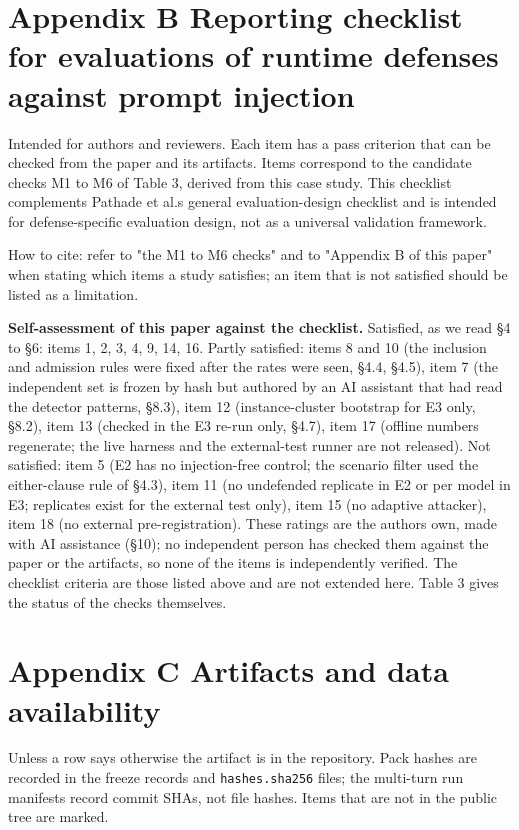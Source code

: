 \documentclass[10pt]{article}
\begin{document}
\section{Appendix B Reporting checklist for evaluations of runtime defenses against prompt injection}

Intended for authors and reviewers. Each item has a pass criterion that can be checked from the paper and its artifacts. Items correspond to the candidate checks M1 to M6 of Table 3, derived from this case study. This checklist complements Pathade et al.\textquotesingle s general evaluation-design checklist and is intended for defense-specific evaluation design, not as a universal validation framework.



How to cite: refer to "the M1 to M6 checks" and to "Appendix B of this paper" when stating which items a study satisfies; an item that is not satisfied should be listed as a limitation.

\textbf{Self-assessment of this paper against the checklist.} Satisfied, as we read §4 to §6: items 1, 2, 3, 4, 9, 14, 16. Partly satisfied: items 8 and 10 (the inclusion and admission rules were fixed after the rates were seen, §4.4, §4.5), item 7 (the independent set is frozen by hash but authored by an AI assistant that had read the detector patterns, §8.3), item 12 (instance-cluster bootstrap for E3 only, §8.2), item 13 (checked in the E3 re-run only, §4.7), item 17 (offline numbers regenerate; the live harness and the external-test runner are not released). Not satisfied: item 5 (E2 has no injection-free control; the scenario filter used the either-clause rule of §4.3), item 11 (no undefended replicate in E2 or per model in E3; replicates exist for the external test only), item 15 (no adaptive attacker), item 18 (no external pre-registration). These ratings are the authors\textquotesingle{} own, made with AI assistance (§10); no independent person has checked them against the paper or the artifacts, so none of the items is independently verified. The checklist criteria are those listed above and are not extended here. Table 3 gives the status of the checks themselves.

\section{Appendix C Artifacts and data availability}

Unless a row says otherwise the artifact is in the repository. Pack hashes are recorded in the freeze records and \texttt{hashes.sha256} files; the multi-turn run manifests record commit SHAs, not file hashes. Items that are not in the public tree are marked.
\end{document}
